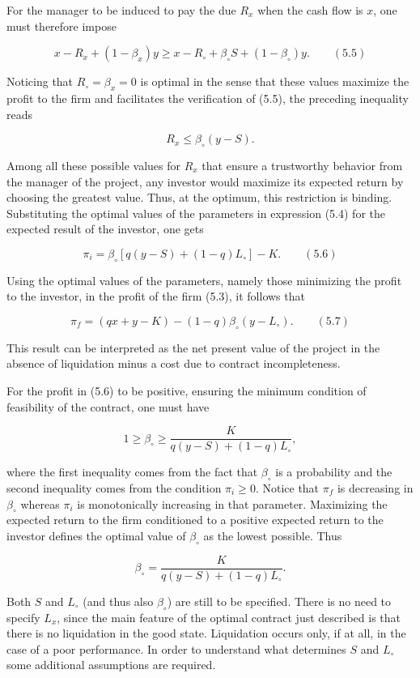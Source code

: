 \documentclass[11pt,a4paper]{article}
\begin{document}
For the manager to be induced to pay the due \(R_x\) when the cash flow is \(x\), one must therefore
impose

\[x - R_x + (1 - \beta_x)y \geq x - R_\circ + \beta_\circ S + (1 - \beta_\circ)y. \qquad (5.5)\]

Noticing that \(R_\circ = \beta_x = 0\) is optimal in the sense that these values maximize the
profit to the firm and facilitates the verification of (5.5), the preceding inequality reads

\[R_x \leq \beta_\circ(y - S).\]

Among all these possible values for \(R_x\) that ensure a trustworthy behavior from the manager of
the project, any investor would maximize its expected return by choosing the greatest value. Thus,
at the optimum, this restriction is binding. Substituting the optimal values of the parameters in
expression (5.4) for the expected result of the investor, one gets

\[\pi_i = \beta_\circ[q(y - S) + (1 - q)L_\circ] - K. \qquad (5.6)\]

Using the optimal values of the parameters, namely those minimizing the profit to the investor, in
the profit of the firm (5.3), it follows that

\[\pi_f = (qx + y - K) - (1 - q)\beta_\circ(y - L_\circ). \qquad (5.7)\]

This result can be interpreted as the net present value of the project in the absence of liquidation
minus a cost due to contract incompleteness.

For the profit in (5.6) to be positive, ensuring the minimum condition of feasibility of the
contract, one must have

\[1 \geq \beta_\circ \geq \frac{K}{q(y - S) + (1 - q)L_\circ},\]

where the first inequality comes from the fact that \(\beta_\circ\) is a probability and the second
inequality comes from the condition \(\pi_i \geq 0\). Notice that \(\pi_f\) is decreasing in
\(\beta_\circ\) whereas \(\pi_i\) is monotonically increasing in that parameter. Maximizing the
expected return to the firm conditioned to a positive expected return to the investor defines the
optimal value of \(\beta_\circ\) as the lowest possible. Thus

\[\beta_\circ = \frac{K}{q(y - S) + (1 - q)L_\circ}.\]

Both \(S\) and \(L_\circ\) (and thus also \(\beta_\circ\)) are still to be specified. There is no
need to specify \(L_x\), since the main feature of the optimal contract just described is that there
is no liquidation in the good state. Liquidation occurs only, if at all, in the case of a poor
performance. In order to understand what determines \(S\) and \(L_\circ\) some additional
assumptions are required.
\end{document}
